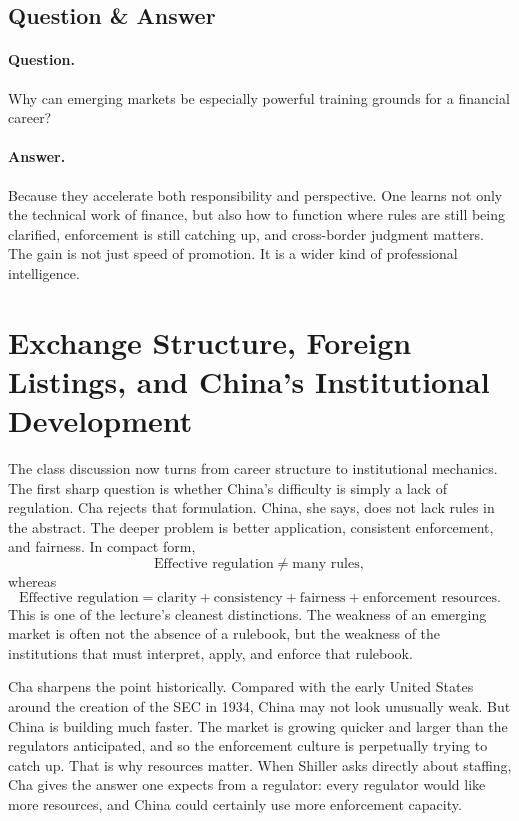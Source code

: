 \subsection{Question \& Answer}

\paragraph{Question.} Why can emerging markets be especially powerful training grounds for a financial career?

\paragraph{Answer.} Because they accelerate both responsibility and perspective. One learns not only the technical work of finance, but also how to function where rules are still being clarified, enforcement is still catching up, and cross-border judgment matters. The gain is not just speed of promotion. It is a wider kind of professional intelligence.

\section{Exchange Structure, Foreign Listings, and China's Institutional Development}

The class discussion now turns from career structure to institutional mechanics. The first sharp question is whether China's difficulty is simply a lack of regulation. Cha rejects that formulation. China, she says, does not lack rules in the abstract. The deeper problem is better application, consistent enforcement, and fairness. In compact form,
\begin{equation}
\text{Effective regulation} \neq \text{many rules},
\end{equation}
whereas
\begin{equation}
\text{Effective regulation}
=
\text{clarity}
+
\text{consistency}
+
\text{fairness}
+
\text{enforcement resources}.
\end{equation}
This is one of the lecture's cleanest distinctions. The weakness of an emerging market is often not the absence of a rulebook, but the weakness of the institutions that must interpret, apply, and enforce that rulebook.

Cha sharpens the point historically. Compared with the early United States around the creation of the SEC in 1934, China may not look unusually weak. But China is building much faster. The market is growing quicker and larger than the regulators anticipated, and so the enforcement culture is perpetually trying to catch up. That is why resources matter. When Shiller asks directly about staffing, Cha gives the answer one expects from a regulator: every regulator would like more resources, and China could certainly use more enforcement capacity.

